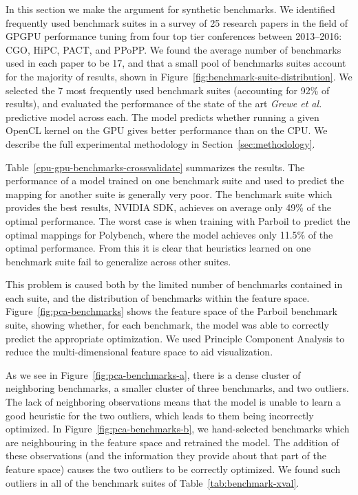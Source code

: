 In this section we make the argument for synthetic benchmarks. We identified frequently used benchmark suites in a survey of 25 research papers in the field of GPGPU performance tuning from four top tier conferences between 2013--2016: CGO, HiPC, PACT, and PPoPP. We found the average number of benchmarks used in each paper to be 17, and that a small pool of benchmarks suites account for the majority of results, shown in Figure~\ref{fig:benchmark-suite-distribution}. We selected the 7 most frequently used benchmark suites (accounting for 92\% of results), and evaluated the performance of the state of the art \emph{Grewe et   al.}~\cite{Grewe2013} predictive model across each. The model predicts whether running a given OpenCL kernel on the GPU gives better performance than on the CPU. We describe the full experimental methodology in Section~\ref{sec:methodology}.

Table~\ref{cpu-gpu-benchmarks-crossvalidate} summarizes the results. The performance of a model trained on one benchmark suite and used to predict the mapping for another suite is generally very poor. The benchmark suite which provides the best results, NVIDIA SDK, achieves on average only 49\% of the optimal performance. The worst case is when training with Parboil to predict the optimal mappings for Polybench, where the model achieves only 11.5\% of the optimal performance. From this it is clear that heuristics learned on one benchmark suite fail to generalize across other suites.

This problem is caused both by the limited number of benchmarks contained in each suite, and the distribution of benchmarks within the feature space. Figure~\ref{fig:pca-benchmarks} shows the feature space of the Parboil benchmark suite, showing whether, for each benchmark, the model was able to correctly predict the appropriate optimization.  We used Principle Component Analysis to reduce the multi-dimensional feature space to aid visualization.

As we see in Figure~\ref{fig:pca-benchmarks-a}, there is a dense cluster of neighboring benchmarks, a smaller cluster of three benchmarks, and two outliers. The lack of neighboring observations means that the model is unable to learn a good heuristic for the two outliers, which leads to them being incorrectly optimized. In Figure~\ref{fig:pca-benchmarks-b}, we hand-selected benchmarks which are neighbouring in the feature space and retrained the model. The addition of these observations (and the information they provide about that part of the feature space) causes the two outliers to be correctly optimized. We found such outliers in all of the benchmark suites of Table~\ref{tab:benchmark-xval}.

